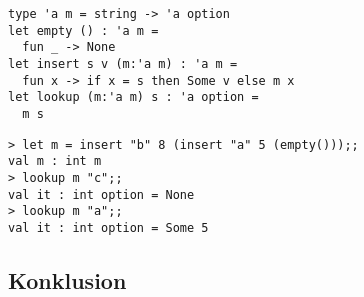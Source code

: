\documentclass[rgb]{beamer}
\begin{document}
\begin{frame}[fragile]
\begin{footnotesize}


\begin{lstlisting}[numbers=none,frame=none,mathescape]
type 'a m = string -> 'a option
let empty () : 'a m =
  fun _ -> None
let insert s v (m:'a m) : 'a m =
  fun x -> if x = s then Some v else m x
let lookup (m:'a m) s : 'a option =
  m s
\end{lstlisting}


\begin{lstlisting}[numbers=none,frame=none,mathescape]
> let m = insert "b" 8 (insert "a" 5 (empty()));;
val m : int m
> lookup m "c";;
val it : int option = None
> lookup m "a";;
val it : int option = Some 5
\end{lstlisting}

\end{footnotesize}
\end{frame}

\subsection*{Konklusion}
\begin{frame}[fragile]

  \vspace{3mm}
  \tableofcontents
\end{frame}
\end{document}
